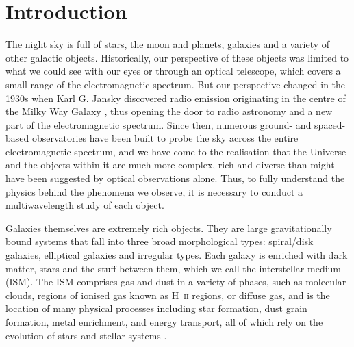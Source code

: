 \pagestyle{fancy}
\headheight 20pt
\chead{}
\lfoot{}
\cfoot{\thepage}
\rfoot{}
\renewcommand{\headrulewidth}{0.1pt}
\renewcommand{\footrulewidth}{0.1pt}

\chapter{Introduction} \label{chapter1} 

\thispagestyle{fancy} 
The night sky is full of stars, the moon and planets, galaxies and a variety of other galactic objects.  Historically, our perspective of these objects was limited to what we could see with our eyes or through an optical telescope, which covers a small range of the electromagnetic spectrum.  But our perspective changed in the 1930s when Karl G. Jansky discovered radio emission originating in the centre of the Milky Way Galaxy \citep{1933Natur.132...66J}, thus opening the door to radio astronomy and a new part of the electromagnetic spectrum.  Since then, numerous ground- and spaced-based observatories have been built to probe the sky across the entire electromagnetic spectrum, and we have come to the realisation that the Universe and the objects within it are much more complex, rich and diverse than might have been suggested by optical observations alone.  Thus, to fully understand the physics behind the phenomena we observe, it is necessary to conduct a multiwavelength study of each object.

Galaxies themselves are extremely rich objects.  They are large gravitationally bound systems that fall into three broad morphological types: spiral/disk galaxies, elliptical galaxies and irregular types.  Each galaxy is enriched with dark matter, stars and the stuff between them, which we call the interstellar medium (ISM).  The ISM comprises gas and dust in a variety of phases, such as molecular clouds, regions of ionised gas known as H~\textsc{ii} regions, or diffuse gas, and is the location of many physical processes including star formation, dust grain formation, metal enrichment, and energy transport, all of which rely on the evolution of stars and stellar systems \citep{1995ASPC...73....3T}.  

